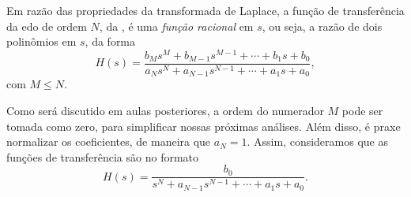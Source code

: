 Em razão das propriedades da transformada de Laplace, a função de transferência da \ac{edo} de ordem $N$, da , é uma \emph{função racional} em $s$, ou seja, a razão de dois polinômios em $s$, da forma
\begin{equation}
	H(s)=\frac{b_Ms^M+b_{M-1}s^{M-1}+\cdots+b_1s+b_0}{a_Ns^N+a_{N-1}s^{N-1}+\cdots+a_1s+a_0},
\end{equation}
com $M\leq N$.

Como será discutido em aulas posteriores, a ordem do numerador $M$ pode ser tomada como zero, para simplificar nossas próximas análises. Além disso, é praxe normalizar os coeficientes, de maneira que $a_N=1$. Assim, consideramos que as funções de transferência são no formato
\begin{equation}
	\boxed{H(s)=\frac{b_0}{s^N+a_{N-1}s^{N-1}+\cdots+a_1s+a_0}.}
\end{equation}
